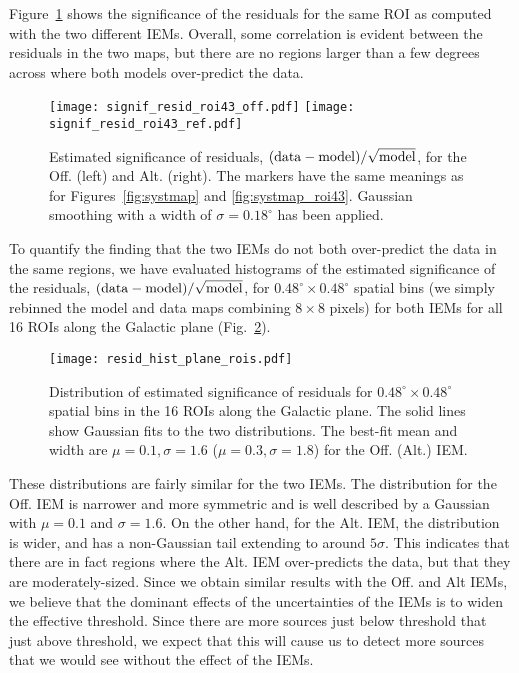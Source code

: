 \documentclass[iop]{emulateapj}
\begin{document}
Figure~\ref{fig:signif_resid} shows the significance of the residuals 
  for the same ROI as computed with the two different IEMs.  Overall,  
  some correlation is evident between the residuals in the two maps,
  but there are no regions larger than a few degrees across where both models over-predict the data.

\begin{figure*}[!ht]
  \centering
\texttt{[image: signif\_resid\_roi43\_off.pdf]}
\texttt{[image: signif\_resid\_roi43\_ref.pdf]}
\caption{Estimated significance of residuals, $({\rm data} - {\rm model})/\sqrt{\rm model}$, 
  for the Off. (left) and Alt. (right).   The markers have the 
  same meanings as for Figures~\ref{fig:systmap} and \ref{fig:systmap_roi43}.
  Gaussian smoothing with a width of $\sigma=0.18^\circ$ has been applied.}
\label{fig:signif_resid} 
\end{figure*}

To quantify the finding that the two IEMs do not both over-predict
  the data in the same regions, we have evaluated histograms of the estimated
  significance of the residuals, $({\rm data} - {\rm model})/\sqrt{\rm model}$, for 
  $0.48^\circ \times 0.48^\circ$ spatial bins (we simply rebinned the
  model and data maps combining $8\times8$ pixels) for both IEMs for all 16 ROIs along the
  Galactic plane (Fig.~\ref{fig:resid_hist}).

\begin{figure}[!ht]
  \centering
\texttt{[image: resid\_hist\_plane\_rois.pdf]}
\caption{Distribution of estimated significance of residuals for 
  $0.48^\circ \times 0.48^\circ$ spatial bins in the 16 ROIs along the Galactic plane.  The
  solid lines show Gaussian fits to the two distributions.  The best-fit
  mean and width are $\mu = 0.1, \sigma = 1.6$ ($\mu = 0.3, \sigma = 1.8$) for the
  Off. (Alt.) IEM.}
\label{fig:resid_hist} 
\end{figure}

These distributions are fairly similar for the two IEMs. 
  The distribution for the Off. IEM is narrower and more symmetric and
  is well described by a Gaussian with $\mu=0.1$ and $\sigma=1.6$.  
  On the other hand, for the Alt. IEM, the distribution is wider, and
  has a non-Gaussian tail extending to around $5 \sigma$.  This
  indicates that there are in fact regions where the Alt. IEM
  over-predicts the data, but that they are moderately-sized.
  Since we obtain similar results with the Off. and Alt IEMs,  we
  believe that the dominant effects of the uncertainties of the IEMs
  is to widen the effective threshold.   Since there are more sources
  just below threshold that just above threshold, we expect that this
  will cause us to detect more sources that we would see without
  the effect of the IEMs.
\end{document}
